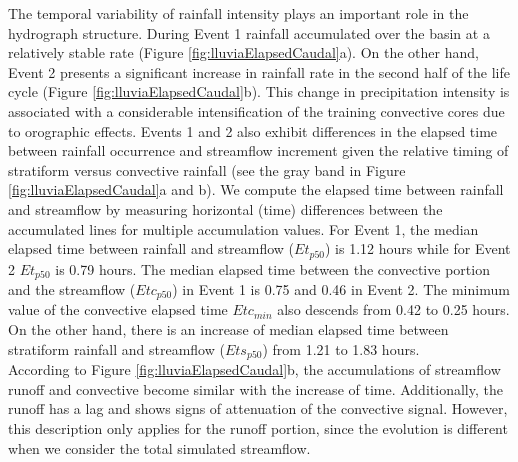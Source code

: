 \documentclass[hess, manuscript]{copernicus}
\begin{document}
The temporal variability of rainfall intensity plays an important role in the  hydrograph structure. During Event 1 rainfall accumulated over the basin at a relatively stable rate (Figure \ref{fig:lluviaElapsedCaudal}a).  On the other hand, Event 2 presents a significant increase in rainfall rate in the second half of the life cycle (Figure \ref{fig:lluviaElapsedCaudal}b).  This change in precipitation intensity is associated with a considerable intensification of the training convective cores due to orographic effects. Events 1 and 2 also exhibit differences in the elapsed time between rainfall occurrence and streamflow increment given the relative timing of stratiform versus convective rainfall (see the gray band in Figure \ref{fig:lluviaElapsedCaudal}a and b).  We compute the elapsed time between rainfall and streamflow by measuring horizontal (time) differences between the accumulated lines for multiple accumulation values. For Event 1, the median elapsed time between rainfall and streamflow ($Et_{p50}$) is 1.12 hours while for Event 2 $Et_{p50}$ is 0.79 hours.  The median elapsed time between the convective portion and the streamflow ($Etc_{p50}$) in Event 1 is 0.75 and 0.46 in Event 2. The minimum value of the convective elapsed time $Etc_{min}$ also descends from 0.42 to 0.25 hours.  On the other hand, there is an increase of median elapsed time between stratiform rainfall and streamflow ($Ets_{p50}$) from 1.21 to 1.83 hours.\\  

According to Figure \ref{fig:lluviaElapsedCaudal}b, the accumulations of streamflow runoff and convective become similar with the increase of time.  Additionally,  the runoff has a lag and shows signs of attenuation of the convective signal.  However, this description only applies for the runoff portion, since the evolution is different when we consider the total simulated streamflow.\\
\end{document}
